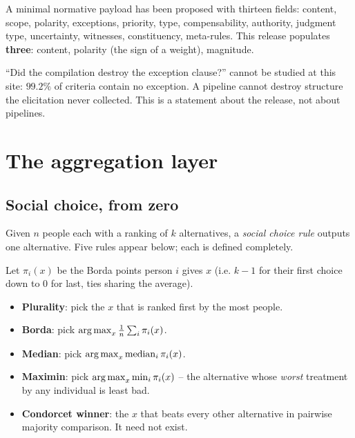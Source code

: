 A minimal normative payload has been proposed with thirteen fields: content,
scope, polarity, exceptions, priority, type, compensability, authority, judgment
type, uncertainty, witnesses, constituency, meta-rules. This release populates
\textbf{three}: content, polarity (the sign of a weight), magnitude.

\begin{corollary}
``Did the compilation destroy the exception clause?'' cannot be studied at this
site: $99.2\%$ of criteria contain no exception. A pipeline cannot destroy
structure the elicitation never collected. This is a statement about the release,
not about pipelines.
\end{corollary}

\section{The aggregation layer}
\label{sec:agg}

\subsection{Social choice, from zero}

Given $n$ people each with a ranking of $k$ alternatives, a \emph{social choice
rule} outputs one alternative. Five rules appear below; each is defined
completely.

\begin{definition}[Rules]
\label{def:rules}
Let $\pi_i(x)$ be the Borda points person $i$ gives $x$ (i.e. $k-1$ for their
first choice down to $0$ for last, ties sharing the average).
\begin{itemize}
\item \textbf{Plurality}: pick the $x$ that is ranked first by the most people.
\item \textbf{Borda}: pick $\operatorname*{arg\,max}_x \frac1n\sum_i \pi_i(x)$.
\item \textbf{Median}: pick $\operatorname*{arg\,max}_x \operatorname{median}_i \pi_i(x)$.
\item \textbf{Maximin}: pick $\operatorname*{arg\,max}_x \min_i \pi_i(x)$ -- the alternative whose
      \emph{worst} treatment by any individual is least bad.
\item \textbf{Condorcet winner}: the $x$ that beats every other alternative in
      pairwise majority comparison. It need not exist.
\end{itemize}
\end{definition}

